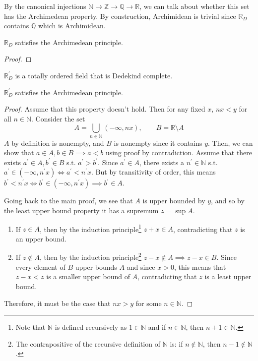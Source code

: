   By the canonical injections $\mathbb{N} \rightarrow \mathbb{Z} \rightarrow \mathbb{Q} \rightarrow \mathbb{R}$, we can talk about whether this set has the Archimedean property. By construction, Archimidean is trivial since $\mathbb{R}_D$ contains $\mathbb{Q}$ which is Archimidean. 

  \begin{theorem}
    $\mathbb{R}_D$ satisfies the Archimedean principle. 
  \end{theorem}
  \begin{proof}
    
  \end{proof}

  \begin{definition}
    $\mathbb{R}_D^\prime$ is a totally ordered field that is Dedekind complete.
  \end{definition}

  \begin{theorem}
    $\mathbb{R}_D^\prime$ satisfies the Archimedean principle. 
  \end{theorem}
  \begin{proof}
    Assume that this property doesn't hold. Then for any fixed $x$, $nx < y$ for all $n \in \mathbb{N}$. Consider the set 
    \begin{equation}
      A = \bigcup_{n \in \mathbb{N}} (-\infty, nx), \qquad B = \mathbb{R} \setminus A
    \end{equation}
    $A$ by definition is nonempty, and $B$ is nonempty since it contains $y$. Then, we can show that $a \in A, b \in B \implies a < b$ using proof by contradiction. Assume that there exists $a^\prime \in A, b^\prime \in B$ s.t. $a^\prime > b^\prime$. Since $a^\prime \in A$, there exists a $n^\prime \in \mathbb{N}$ s.t. $a^\prime \in (-\infty, n^\prime x) \iff a^\prime < n^\prime x$. But by transitivity of order, this means $b^\prime < n^\prime x \iff b^\prime \in (-\infty, n^\prime x) \implies b^\prime \in A$. 

    Going back to the main proof, we see that $A$ is upper bounded by $y$, and so by the least upper bound property it has a supremum $z = \sup{A}$. 
    \begin{enumerate}
      \item If $z \in A$, then by the induction principle\footnote{Note that $\mathbb{N}$ is defined recursively as $1 \in \mathbb{N}$ and if $n \in \mathbb{N}$, then $n+1 \in \mathbb{N}$. } $z + x \in A$, contradicting that $z$ is an upper bound. 
      \item If $z \not\in A$, then by the induction principle\footnote{The contrapositive of the recursive definition of $\mathbb{N}$ is: if $n \not\in \mathbb{N}$, then $n-1 \not\in \mathbb{N}$.} $z-x \not\in A \implies z-x \in B$. Since every element of $B$ upper bounds $A$ and since $x > 0$, this means that $z-x < z$ is a smaller upper bound of $A$, contradicting that $z$ is a least upper bound. 
    \end{enumerate}
    Therefore, it must be the case that $nx > y$ for some $n \in \mathbb{N}$. 
  \end{proof}

